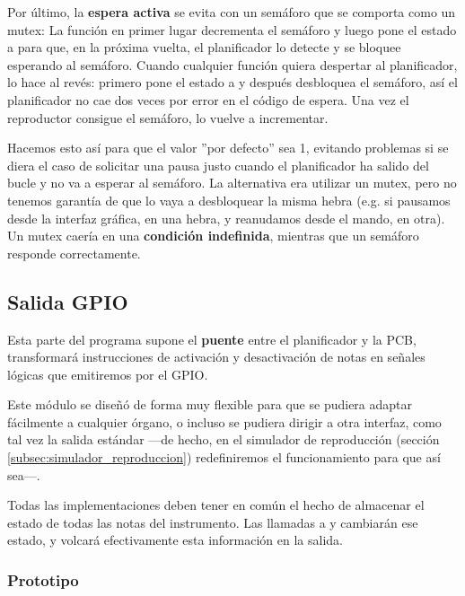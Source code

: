 Por último, la \textbf{espera activa} se evita con un semáforo que se comporta como un \acrshort{mutex}: La función  en primer lugar decrementa el semáforo y luego pone el estado a  para que, en la próxima vuelta, el planificador lo detecte y se bloquee esperando al semáforo. Cuando cualquier función quiera despertar al planificador, lo hace al revés: primero pone el estado a  y después desbloquea el semáforo, así el planificador no cae dos veces por error en el código de espera. Una vez el reproductor consigue el semáforo, lo vuelve a incrementar. 

Hacemos esto así para que el valor ''por defecto'' sea 1, evitando problemas si se diera el caso de solicitar una pausa justo cuando el planificador ha salido del bucle y no va a esperar al semáforo. La alternativa era utilizar un \acrshort{mutex}, pero no tenemos garantía de que lo vaya a desbloquear la misma hebra (e.g. si pausamos desde la interfaz gráfica, en una hebra, y reanudamos desde el mando, en otra). Un \acrshort{mutex} caería en una \textbf{condición indefinida}, mientras que un semáforo responde correctamente.

\subsection{Salida GPIO}

Esta parte del programa supone el \textbf{puente} entre el planificador y la \acrshort{PCB}, transformará instrucciones de activación y desactivación de notas en señales lógicas que emitiremos por el \acrshort{GPIO}. 

Este módulo se diseñó de forma muy flexible para que se pudiera adaptar fácilmente a cualquier órgano, o incluso se pudiera dirigir a otra interfaz, como tal vez la salida estándar ---de hecho, en el simulador de reproducción (sección \ref{subsec:simulador_reproduccion}) redefiniremos el funcionamiento para que así sea---.

Todas las implementaciones deben tener en común el hecho de almacenar el estado de todas las notas del instrumento. Las llamadas a  y  cambiarán ese estado, y  volcará efectivamente esta información en la salida.

\subsubsection{Prototipo}


